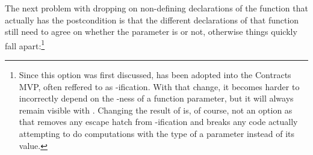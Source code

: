 The next problem with dropping  on non-defining declarations of the function that actually has the postcondition is that the different declarations of that function still need to agree on whether the parameter is  or not, otherwise things quickly fall apart:\footnote{Since this option was first discussed, \cite{P3071R1} has been adopted into the Contracts MVP, often reffered to as -ification.   With that change, it becomes harder to incorrectly depend on the -ness of a function parameter, but it will always remain visible with .  Changing the result of  is, of course, not an option as that removes any escape hatch from -ification and breaks any code actually attempting to do computations with the type of a parameter instead of its value.}

